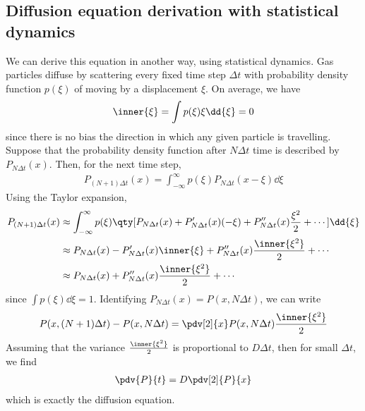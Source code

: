 \subsection{Diffusion equation derivation with statistical dynamics}
We can derive this equation in another way, using statistical dynamics.
Gas particles diffuse by scattering every fixed time step $\Delta t$ with probability density function $p(\xi)$ of moving by a displacement $\xi$.
On average, we have
\begin{align*}
	\inner{\xi} = \int p(\xi) \xi \dd{\xi} = 0
\end{align*}
since there is no bias the direction in which any given particle is travelling.
Suppose that the probability density function after $N\Delta t$ time is described by $P_{N \Delta t}(x)$.
Then, for the next time step,
\begin{align*}
	P_{(N+1)\Delta t}(x) = \int_{-\infty}^\infty p(\xi) P_{N \Delta t}(x - \xi) \dd{\xi}
\end{align*}
Using the Taylor expansion,
\begin{align*}
	P_{(N+1)\Delta t}(x) & \approx \int_{-\infty}^\infty p(\xi) \qty[P_{N \Delta t}(x) + P_{N \Delta t}'(x)(-\xi) + P_{N \Delta t}''(x)\frac{\xi^2}{2} + \cdots] \dd{\xi} \\
	                     & \approx P_{N \Delta t}(x) - P_{N \Delta t}'(x) \inner{\xi} + P_{N \Delta t}''(x) \frac{\inner{\xi^2}}{2} + \cdots                              \\
	                     & \approx P_{N \Delta t}(x) + P_{N \Delta t}''(x) \frac{\inner{\xi^2}}{2} + \cdots
\end{align*}
since $\int p(\xi) \dd{\xi} = 1$.
Identifying $P_{N \Delta t}(x) = P(x, N\Delta t)$, we can write
\begin{align*}
	P(x, (N+1)\Delta t) - P(x, N \Delta t) = \pdv[2]{x} P(x, N\Delta t) \frac{\inner{\xi^2}}{2}
\end{align*}
Assuming that the variance $\frac{\inner{\xi^2}}{2}$ is proportional to $D \Delta t$, then for small $\Delta t$, we find
\begin{align*}
	\pdv{P}{t} = D \pdv[2]{P}{x}
\end{align*}
which is exactly the diffusion equation.

